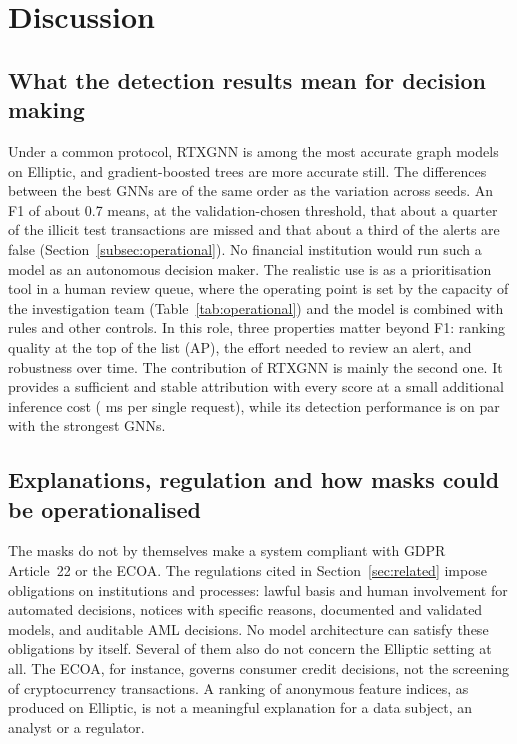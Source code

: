 \section{Discussion}
\label{sec:discussion}

\subsection{What the detection results mean for decision making}
\label{subsec:disc_decision}

Under a common protocol, RTXGNN is among the most accurate graph models on Elliptic, and gradient-boosted trees are more accurate still. The differences between the best GNNs are of the same order as the variation across seeds. An F1 of about 0.7 means, at the validation-chosen threshold, that about a quarter of the illicit test transactions are missed and that about a third of the alerts are false (Section~\ref{subsec:operational}). No financial institution would run such a model as an autonomous decision maker. The realistic use is as a prioritisation tool in a human review queue, where the operating point is set by the capacity of the investigation team (Table~\ref{tab:operational}) and the model is combined with rules and other controls. In this role, three properties matter beyond F1: ranking quality at the top of the list (AP), the effort needed to review an alert, and robustness over time. The contribution of RTXGNN is mainly the second one. It provides a sufficient and stable attribution with every score at a small additional inference cost (\rtxLatBoneExp{} ms per single request), while its detection performance is on par with the strongest GNNs.

\subsection{Explanations, regulation and how masks could be operationalised}
\label{subsec:regulatory}

The masks do not by themselves make a system compliant with GDPR Article~22 or the ECOA. The regulations cited in Section~\ref{sec:related} impose obligations on institutions and processes: lawful basis and human involvement for automated decisions, notices with specific reasons, documented and validated models, and auditable AML decisions. No model architecture can satisfy these obligations by itself. Several of them also do not concern the Elliptic setting at all. The ECOA, for instance, governs consumer credit decisions, not the screening of cryptocurrency transactions. A ranking of anonymous feature indices, as produced on Elliptic, is not a meaningful explanation for a data subject, an analyst or a regulator.

